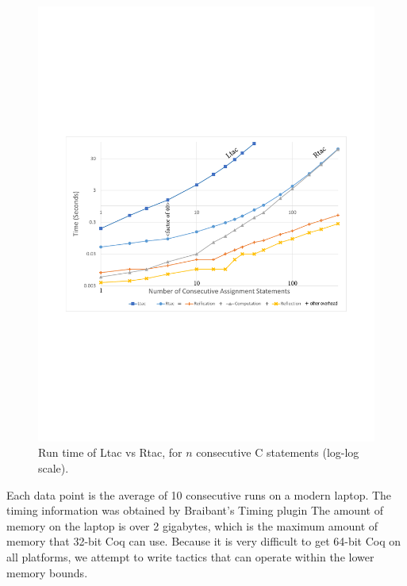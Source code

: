 \documentclass{puthesis}
\begin{document}
\begin{figure}
\vspace{-2ex}
\includegraphics[width=\textwidth]{chart.pdf}
\vspace{-4ex}
\caption{Run time of Ltac vs Rtac, for $n$ consecutive C statements (log-log scale).}
\label{fig:chart}
\vspace{-4ex}
\end{figure}

Each data point is the average of 10 consecutive runs on a modern
laptop.  The timing information was obtained by Braibant's Timing
plugin \cite{braibant:timing} The amount of memory on the laptop is
over 2 gigabytes, which is the maximum amount of memory that 32-bit
Coq can use. Because it is very difficult to get 64-bit Coq on all
platforms, we attempt to write tactics that can operate within the
lower memory bounds.
\end{document}
